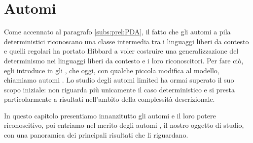 \chapter{Automi }
Come accennato al paragrafo \ref{subs:prel:PDA}, il fatto che gli automi a pila deterministici riconoscano una classe intermedia tra i linguaggi liberi da contesto e quelli regolari ha portato Hibbard a voler costruire una generalizzazione del determinismo nei linguaggi liberi da contesto e i loro riconoscitori. Per fare ciò, egli introduce in \cite{Hibbard:67:CFdet} gli , che oggi, con qualche piccola modifica al modello, chiamiamo automi . Lo studio degli automi limited ha ormai superato il suo scopo iniziale: non riguarda più unicamente il caso deterministico e si presta particolarmente a risultati nell'ambito della complessità descrizionale.

In questo capitolo presentiamo innanzitutto gli automi  e il loro potere riconoscitivo, poi entriamo nel merito degli automi , il nostro oggetto di studio, con una panoramica dei principali risultati che li riguardano.



